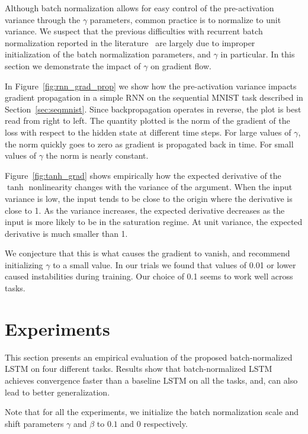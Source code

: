 \documentclass{article} %
\begin{document}
Although batch normalization allows for easy control of the pre-activation variance through the $\gamma$ parameters,
common practice is to normalize to unit variance.
We suspect that the previous difficulties with recurrent batch normalization reported in the literature~\cite{cesar,baidu}
are largely due to improper initialization of the batch normalization parameters, and $\gamma$ in particular.
In this section we demonstrate the impact of $\gamma$ on gradient flow.

In Figure~\ref{fig:rnn_grad_prop} we show how the pre-activation variance impacts gradient propagation in a simple RNN on the sequential MNIST task described in Section~\ref{sec:seqmnist}.
Since backpropagation operates in reverse, the plot is best read from right to left.
The quantity plotted is the norm of the gradient of the loss with respect to the hidden state at different time steps.
For large values of $\gamma$, the norm quickly goes to zero as gradient is propagated back in time.
For small values of $\gamma$ the norm is nearly constant.

Figure~\ref{fig:tanh_grad} shows empirically how the expected derivative of the $\tanh$ nonlinearity changes with the variance of the argument.
When the input variance is low, the input tends to be close to the origin where the derivative is close to 1.
As the variance increases, the expected derivative decreases as the input is more likely to be in the saturation regime.
At unit variance, the expected derivative is much smaller than 1.

We conjecture that this is what causes the gradient to vanish, and recommend initializing $\gamma$ to a small value.
In our trials we found that values of 0.01 or lower caused instabilities during training.
Our choice of 0.1 seems to work well across tasks.

\section{Experiments}
\label{sec:experiments}

This section presents an empirical evaluation of the proposed batch-normalized LSTM on four different tasks. Results show that batch-normalized LSTM achieves convergence faster than a baseline LSTM on all the tasks, and, can also lead to better generalization.

Note that for all the experiments, we initialize the batch normalization scale and shift parameters $\gamma$ and $\beta$ to $0.1$ and $0$ respectively.
\end{document}
